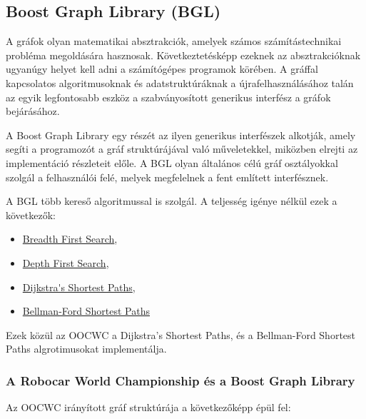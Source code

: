 \documentclass[a4paper,12pt]{report}
\begin{document}
\subsection{Boost Graph Library (BGL)}
\label{bgl}

A gráfok olyan matematikai absztrakciók, amelyek számos számítástechnikai probléma megoldására hasznosak. Következtetésképp ezeknek az absztrakcióknak ugyanúgy helyet kell adni a számítógépes programok körében. A gráffal kapcsolatos algoritmusoknak és adatstruktúráknak a újrafelhasználásához talán az egyik legfontosabb eszköz a szabványosított generikus interfész a gráfok bejárásához. 

\vspace{2mm}
A Boost Graph Library egy részét az ilyen generikus interfészek alkotják, amely segíti a programozót a gráf struktúrájával való műveletekkel, miközben elrejti az implementáció részleteit előle. A BGL olyan általános célú gráf osztályokkal szolgál a felhasználói felé, melyek megfelelnek a fent említett interfésznek.

\vspace{2mm}
A BGL több kereső algoritmussal is szolgál. A teljesség igénye nélkül ezek a következők:
\begin{itemize}
\item \url{Breadth First Search},
\item \url{Depth First Search},
\item \url{Dijkstra's Shortest Paths},
\item \url{Bellman-Ford Shortest Paths}
\end{itemize}

Ezek közül az OOCWC a Dijkstra's Shortest Paths, és a Bellman-Ford Shortest Paths algrotimusokat implementálja.

\subsubsection{A Robocar World Championship és a Boost Graph Library}
\label{oocwcbgl}

Az OOCWC irányított gráf struktúrája a következőképp épül fel:


\end{document}
